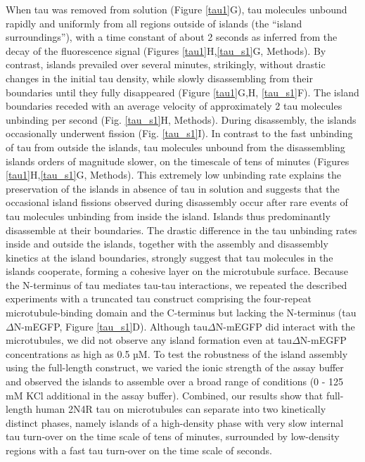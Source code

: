 When tau was removed from solution (Figure \ref{tau1}G), tau molecules unbound rapidly and uniformly from all regions outside of islands (the “island surroundings”), with a time constant of about 2 seconds as inferred from the decay of the fluorescence signal (Figures \ref{tau1}H,\ref{tau_s1}G, Methods). By contrast, islands prevailed over several minutes, strikingly, without drastic changes in the initial tau density, while slowly disassembling from their boundaries until they fully disappeared (Figure \ref{tau1}G,H, \ref{tau_s1}F). The island boundaries receded with an average velocity of approximately 2 tau molecules unbinding per second (Fig. \ref{tau_s1}H, Methods). During disassembly, the islands occasionally underwent fission (Fig. \ref{tau_s1}I). In contrast to the fast unbinding of tau from outside the islands, tau molecules unbound from the disassembling islands orders of magnitude slower, on the timescale of tens of minutes (Figures \ref{tau1}H,\ref{tau_s1}G, Methods). This extremely low unbinding rate explains the preservation of the islands in absence of tau in solution and suggests that the occasional island fissions observed during disassembly occur after rare events of tau molecules unbinding from inside the island. Islands thus predominantly disassemble at their boundaries. The drastic difference in the tau unbinding rates inside and outside the islands, together with the assembly and disassembly kinetics at the island boundaries, strongly suggest that tau molecules in the islands cooperate, forming a cohesive layer on the microtubule surface. Because the N-terminus of tau mediates tau-tau interactions\parencite{Gamblin2003}, we repeated the described experiments with a truncated tau construct comprising the four-repeat microtubule-binding domain and the C-terminus but lacking the N-terminus (tau$\Delta$N-mEGFP, Figure \ref{tau_s1}D). Although tau$\Delta$N-mEGFP did interact with the microtubules, we did not observe any island formation even at tau$\Delta$N-mEGFP concentrations as high as 0.5 µM. To test the robustness of the island assembly using the full-length construct, we varied the ionic strength of the assay buffer and observed the islands to assemble over a broad range of conditions (0 - 125 mM KCl additional in the assay buffer). Combined, our results show that full-length human 2N4R tau on microtubules can separate into two kinetically distinct phases, namely islands of a high-density phase with very slow internal tau turn-over on the time scale of tens of minutes, surrounded by low-density regions with a fast tau turn-over on the time scale of seconds.

